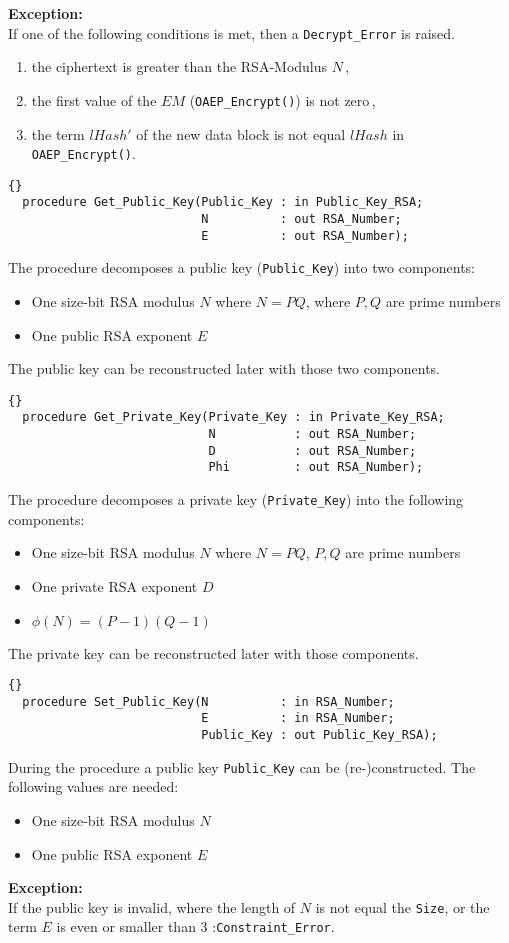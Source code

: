 \noindent\textbf{Exception:}\\
If one of the following conditions is
met, then a \texttt{Decrypt\_Error} is raised.
\begin{enumerate}
\item the ciphertext is greater
 than the RSA-Modulus $N$\,,
\item the first value of the $EM$
 (\texttt{OAEP\_Encrypt()}) is not zero\,,
\item the term $lHash'$ of the new data block is not equal $lHash$ in
  \texttt{OAEP\_Encrypt()}.
\end{enumerate}

\hhline
\begin{lstlisting}{}
  procedure Get_Public_Key(Public_Key : in Public_Key_RSA;
                           N          : out RSA_Number;
                           E          : out RSA_Number);
\end{lstlisting}
The procedure decomposes a public key (\texttt{Public\_Key}) into two
components:
\begin{itemize}
\item One size-bit RSA modulus $N$ where $N=PQ$, where $P,Q$ are prime numbers
\item One public RSA exponent $E$
\end{itemize}
The public key can be reconstructed later with those two components.

\hhline
\begin{lstlisting}{}
  procedure Get_Private_Key(Private_Key : in Private_Key_RSA;
                            N           : out RSA_Number;
                            D           : out RSA_Number;
                            Phi         : out RSA_Number);
\end{lstlisting}
The procedure decomposes a private key (\texttt{Private\_Key}) into
the following components:
\begin{itemize}
\item One size-bit RSA modulus $N$ where $N=PQ$, $P,Q$ are prime numbers
\item One private RSA exponent $D$
\item $\phi(N)=(P-1)(Q-1)$
\end{itemize}
The private key can be reconstructed later with those components.

\hhline
\begin{lstlisting}{}
  procedure Set_Public_Key(N          : in RSA_Number;
                           E          : in RSA_Number;
                           Public_Key : out Public_Key_RSA);
\end{lstlisting}
During the procedure a public key \texttt{Public\_Key} can be
(re-)constructed. The following values are needed:
\begin{itemize}
\item One size-bit RSA modulus $N$
\item One public RSA exponent $E$
\end{itemize}
\textbf{Exception:}\\
 If the public key is invalid, where the length
of $N$ is not equal the \texttt{Size}, or the term $E$ is even or
smaller than 3 :\quad \texttt{Constraint\_Error}.


